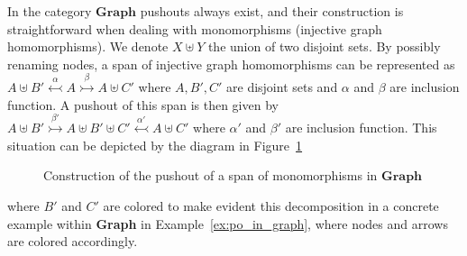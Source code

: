 In the category \(\mathbf{Graph}\) pushouts always exist, and their construction is straightforward when dealing with monomorphisms (injective graph homomorphisms). 
We denote $X\uplus Y$ the union of two disjoint sets. By possibly renaming nodes, a span of injective graph homomorphisms can be represented as
$
A \uplus B' \overset{\alpha}{\leftarrowtail} A \overset{\beta}{\rightarrowtail} A \uplus C'
$
where $A,B',C'$ are disjoint sets and $\alpha$ and $\beta$ are inclusion function. A pushout of this span is then given by
$
A \uplus B'  \overset{\beta'}{\rightarrowtail} A \uplus B' \uplus C'   \overset{\alpha'}{\leftarrowtail} A \uplus C'
$ where $\alpha'$ and $\beta'$ are inclusion function. This situation can be depicted by the diagram in Figure~\ref{fig:po_decomp}
\begin{figure}[htbp] 
    \begin{center}
    \end{center}
    
    \caption{Construction of the pushout of a span of monomorphisms in \(\mathbf{Graph}\)}
    \label{fig:po_decomp}
\end{figure}
where \(B'\) and \(C'\) are colored to make evident this decomposition in a concrete example within \textbf{Graph} in Example~\ref{ex:po_in_graph}, where nodes and arrows are colored accordingly.
